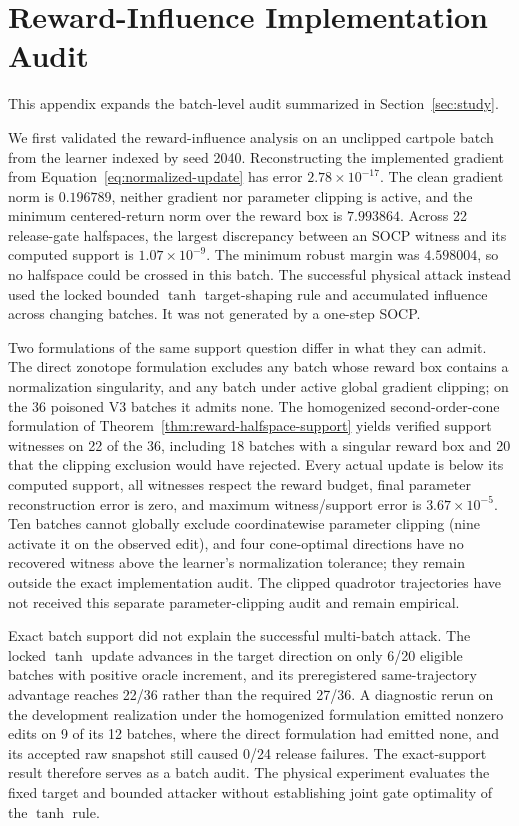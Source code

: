 \section{Reward-Influence Implementation Audit}
\label{sec:appendix-influence}

This appendix expands the batch-level audit summarized in
Section~\ref{sec:study}.

We first validated the reward-influence analysis on an unclipped cartpole
batch from the learner indexed by seed 2040.  Reconstructing the implemented gradient from
Equation~\eqref{eq:normalized-update} has error $2.78\times10^{-17}$.  The
clean gradient norm is $0.196789$, neither gradient nor parameter clipping is
active, and the minimum centered-return norm over the reward box is
$7.993864$.  Across 22 release-gate halfspaces, the largest discrepancy
between an SOCP witness and its computed support is $1.07\times10^{-9}$.  The
minimum robust margin was $4.598004$, so no halfspace could be crossed in this
batch.  The successful physical attack instead used the locked bounded
\(\tanh\) target-shaping rule and accumulated influence across changing
batches.  It was not generated by a one-step SOCP.

Two formulations of the same support question differ in what they can admit.
The direct zonotope formulation excludes any batch whose reward box contains a
normalization singularity, and any batch under active global gradient
clipping; on the 36 poisoned V3 batches it admits none.  The homogenized
second-order-cone formulation of
Theorem~\ref{thm:reward-halfspace-support} yields verified support witnesses
on 22 of the 36, including 18 batches with a singular reward box and 20 that
the clipping exclusion would have rejected.  Every actual update is below its computed support, all
witnesses respect the reward budget, final parameter reconstruction error is
zero, and maximum witness/support error is $3.67\times10^{-5}$.  Ten batches
cannot globally exclude coordinatewise parameter clipping (nine activate it
on the observed edit), and four cone-optimal directions have no recovered
witness above the learner's normalization tolerance; they remain outside the
exact implementation audit.  The clipped quadrotor trajectories have not
received this separate parameter-clipping audit and remain empirical.

Exact batch support did not explain the successful multi-batch attack.
The locked \(\tanh\) update advances in the target direction on only 6/20
eligible batches with positive oracle increment, and its preregistered
same-trajectory advantage reaches 22/36 rather than the required 27/36.  A
diagnostic rerun on the development realization under the homogenized
formulation emitted nonzero edits on 9 of its 12 batches, where the direct
formulation had emitted none, and its accepted raw snapshot still caused 0/24
release failures.  The exact-support result therefore serves
as a batch audit.  The physical experiment evaluates the fixed target and
bounded attacker without establishing joint gate optimality of the \(\tanh\)
rule.
